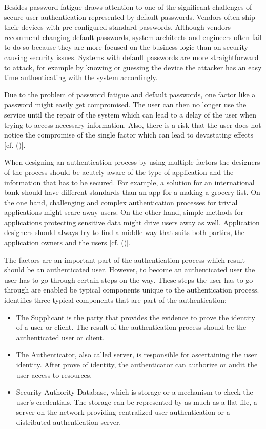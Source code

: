 Besides password fatigue \cite{Todorov:2007:MUI} draws attention to one of the significant challenges of secure user authentication represented by default passwords. Vendors often ship their devices with pre-configured standard passwords. Although vendors recommend changing default passwords, system architects and engineers often fail to do so because they are more focused on the business logic than on security causing security issues. Systems with default passwords are more straightforward to attack, for example by knowing or guessing the device the attacker has an easy time authenticating with the system accordingly. 


 Due to the problem of password fatigue and default passwords, one factor like a password might easily get compromised. The user can then no longer use the service until the repair of the system which can lead to a delay of the user when trying to access necessary information. Also, there is a risk that the user does not notice the compromise of the single factor which can lead to devastating effects [cf. (\cite{Dasgupta:2017:AUA})]. 

When designing an authentication process by using multiple factors the designers of the process should be acutely aware of the type of application and the information that has to be secured. For example, a solution for an international bank should have different standards than an app for a making a grocery list. On the one hand, challenging and complex authentication processes for trivial applications might scare away users. On the other hand, simple methods for applications protecting sensitive data might drive users away as well. Application designers should always try to find a middle way that suits both parties, the application owners and the users [cf. (\cite{NIST:2017:DIG})]. 

The factors are an important part of the authentication process which result should be an authenticated user. However, to become an authenticated user the user has to go through certain steps on the way. These steps the user has to go through are enabled be typical components unique to the authentication process. \cite{Todorov:2007:MUI} identifies three typical components that are part of the authentication:

 \begin{itemize}
 \item The Supplicant is the party that provides the evidence to prove the identity of a user or client. The result of the authentication process should be the authenticated user or client.  
 \item The Authenticator, also called server, is responsible for ascertaining the user identity. After prove of identity, the authenticator can authorize or audit the user access to resources. 
 \item Security Authority Database, which is storage or  a mechanism to check the user's credentials. The storage can be represented by as much as a flat file, a server on the network providing centralized user authentication or a distributed authentication server. 
\end{itemize}

